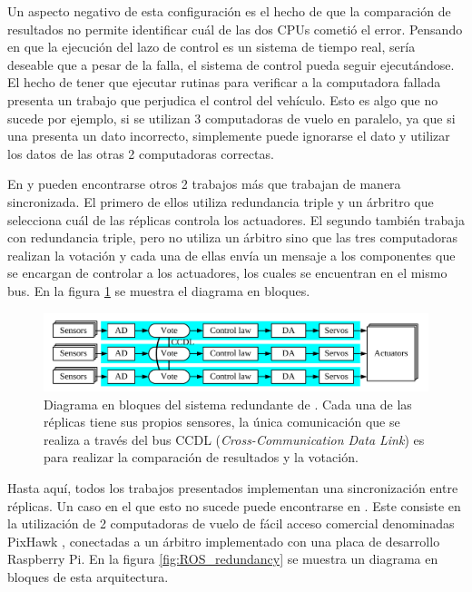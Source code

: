 Un aspecto negativo de esta configuración es el hecho de que la comparación de resultados no permite identificar cuál de las dos CPUs cometió el error. %
Pensando en que la ejecución del lazo de control es un sistema de tiempo real, sería deseable que a pesar de la falla, el sistema de control pueda seguir ejecutándose. El hecho de tener que ejecutar rutinas para verificar a la computadora fallada presenta un trabajo que perjudica el control del vehículo. Esto es algo que no sucede por ejemplo, si se utilizan 3 computadoras de vuelo en paralelo, ya que si una presenta un dato incorrecto, simplemente puede ignorarse el dato y utilizar los datos de las otras 2 computadoras correctas. %

En \cite{chen2015design} y \cite{wang2008development} pueden encontrarse otros 2 trabajos más que trabajan de manera sincronizada. El primero de ellos utiliza redundancia triple y un árbritro que selecciona cuál de las réplicas controla los actuadores. El segundo también trabaja con redundancia triple, pero no utiliza un árbitro sino que las tres computadoras realizan la votación y cada una de ellas envía un mensaje a los componentes que se encargan de controlar a los actuadores, los cuales se encuentran en el mismo bus. En la figura \ref{fig:RS_485_sync} se muestra el diagrama en bloques.

\begin{figure}[htb]
    \centering
    \includegraphics[width=\textwidth]{img/RS_485_sync.png}
    \caption{Diagrama en bloques del sistema redundante de \cite{wang2008development}. Cada una de las réplicas tiene sus propios sensores, la única comunicación que se realiza a través del bus CCDL (\textit{Cross-Communication Data Link}) es para realizar la comparación de resultados y la votación.}
    \label{fig:RS_485_sync}
\end{figure}

Hasta aquí, todos los trabajos presentados implementan una sincronización entre réplicas. Un caso en el que esto no sucede puede encontrarse en \cite{thesis_redundant_ROS}. Este consiste en la utilización de 2 computadoras de vuelo de fácil acceso comercial denominadas PixHawk \cite{dronecode-foundation-2023}, conectadas a un árbitro implementado con una placa de desarrollo Raspberry Pi. En la figura \ref{fig:ROS_redundancy} se muestra un diagrama en bloques de esta arquitectura.

